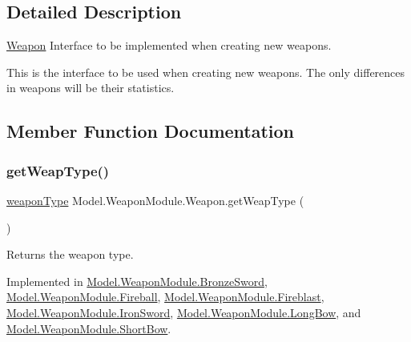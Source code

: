\subsection{Detailed Description}
\hyperlink{interface_model_1_1_weapon_module_1_1_weapon}{Weapon} Interface to be implemented when creating new weapons. 

This is the interface to be used when creating new weapons. The only differences in weapons will be their statistics. 

\subsection{Member Function Documentation}
\hypertarget{interface_model_1_1_weapon_module_1_1_weapon_a175133855ef446d3d87c70d13979be9c}{}\label{interface_model_1_1_weapon_module_1_1_weapon_a175133855ef446d3d87c70d13979be9c} 
\subsubsection{\texorpdfstring{get\+Weap\+Type()}{getWeapType()}}
{\footnotesize\ttfamily \hyperlink{namespace_model_1_1_weapon_module_a3390c266f89e3399c2bc7fa31f13cbec}{weapon\+Type} Model.\+Weapon\+Module.\+Weapon.\+get\+Weap\+Type (\begin{DoxyParamCaption}{ }\end{DoxyParamCaption})}

Returns the weapon type. 

Implemented in \hyperlink{class_model_1_1_weapon_module_1_1_bronze_sword_a3b8efec8bd8cfe293f0bf96dc024a46a}{Model.\+Weapon\+Module.\+Bronze\+Sword}, \hyperlink{class_model_1_1_weapon_module_1_1_fireball_aa979cf9b7c07e36b3fb55ee6d6a43e8b}{Model.\+Weapon\+Module.\+Fireball}, \hyperlink{class_model_1_1_weapon_module_1_1_fireblast_a90f93c7c190cf7e7d1b55b48b56face9}{Model.\+Weapon\+Module.\+Fireblast}, \hyperlink{class_model_1_1_weapon_module_1_1_iron_sword_a886800dd0c3fbebebbf410dab9f91454}{Model.\+Weapon\+Module.\+Iron\+Sword}, \hyperlink{class_model_1_1_weapon_module_1_1_long_bow_aca2986d43dcefb1f3d99c6507a4390cd}{Model.\+Weapon\+Module.\+Long\+Bow}, and \hyperlink{class_model_1_1_weapon_module_1_1_short_bow_a50b5acd4e433303752e04397aeea86df}{Model.\+Weapon\+Module.\+Short\+Bow}.



